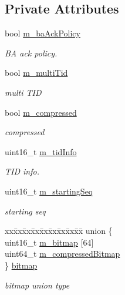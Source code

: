 \subsection*{Private Attributes}
\begin{DoxyCompactItemize}
\item 
bool \hyperlink{classns3_1_1CtrlBAckResponseHeader_a73e1825f961271ed0d746644cf12e3cf}{m\+\_\+ba\+Ack\+Policy}
\begin{DoxyCompactList}\small\item\em BA ack policy. \end{DoxyCompactList}\item 
bool \hyperlink{classns3_1_1CtrlBAckResponseHeader_ab3b2b175ee54daa240e3cc0450c5812e}{m\+\_\+multi\+Tid}
\begin{DoxyCompactList}\small\item\em multi T\+ID \end{DoxyCompactList}\item 
bool \hyperlink{classns3_1_1CtrlBAckResponseHeader_a7d33c0c452139f1d9f110dab89bfcef7}{m\+\_\+compressed}
\begin{DoxyCompactList}\small\item\em compressed \end{DoxyCompactList}\item 
uint16\+\_\+t \hyperlink{classns3_1_1CtrlBAckResponseHeader_aa432979d431ad677830267efa97959da}{m\+\_\+tid\+Info}
\begin{DoxyCompactList}\small\item\em T\+ID info. \end{DoxyCompactList}\item 
uint16\+\_\+t \hyperlink{classns3_1_1CtrlBAckResponseHeader_a9f30acf62831999d1895ba3d0677f732}{m\+\_\+starting\+Seq}
\begin{DoxyCompactList}\small\item\em starting seq \end{DoxyCompactList}\item 
\begin{tabbing}
xx\=xx\=xx\=xx\=xx\=xx\=xx\=xx\=xx\=\kill
union \{\\
\>uint16\_t \hyperlink{classns3_1_1CtrlBAckResponseHeader_a988f3ebcf246f3a4f651659bbbb4bbb5}{m\_bitmap} \mbox{[}64\mbox{]}\\
\>uint64\_t \hyperlink{classns3_1_1CtrlBAckResponseHeader_ab2238987409a9fa5564315230ccca28f}{m\_compressedBitmap}\\
\} \hyperlink{classns3_1_1CtrlBAckResponseHeader_a08f2ce2e8665317a7d381e498cc75453}{bitmap}\\

\end{tabbing}\begin{DoxyCompactList}\small\item\em bitmap union type \end{DoxyCompactList}\end{DoxyCompactItemize}
